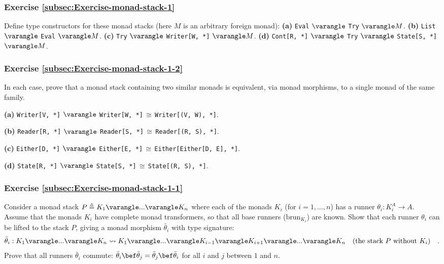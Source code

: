 \subsubsection{Exercise \label{subsec:Exercise-monad-stack-1}\ref{subsec:Exercise-monad-stack-1}}

Define type constructors for these monad stacks (here $M$ is an arbitrary
foreign monad):\textbf{ (a)} \lstinline!Eval! $\varangle$ \lstinline!Try!
$\varangle M$.\textbf{ (b)} \lstinline!List! $\varangle$ \lstinline!Eval!
$\varangle M$.\textbf{ (c)} \lstinline!Try! $\varangle$ \lstinline!Writer[W, *]!
$\varangle M$.\textbf{ (d)} \lstinline!Cont[R, *]! $\varangle$
\lstinline!Try! $\varangle$ \lstinline!State[S, *]! $\varangle M$.

\subsubsection{Exercise \label{subsec:Exercise-monad-stack-1-2}\ref{subsec:Exercise-monad-stack-1-2}}

In each case, prove that a monad stack containing two similar monads
is equivalent, via monad morphisms, to a single monad of the same
family. 

\textbf{(a)}  \lstinline!Writer[V, *]! $\varangle$ \lstinline!Writer[W, *]!$\,\cong\,$\lstinline!Writer[(V, W), *]!.

\textbf{(b)} \lstinline!Reader[R, *]! $\varangle$ \lstinline!Reader[S, *]!$\,\cong\,$\lstinline!Reader[(R, S), *]!.

\textbf{(c)} \lstinline!Either[D, *]! $\varangle$ \lstinline!Either[E, *]!$\,\cong\,$\lstinline!Either[Either[D, E], *]!.

\textbf{(d)} \lstinline!State[R, *]! $\varangle$ \lstinline!State[S, *]!$\,\cong\,$\lstinline!State[(R, S), *]!.

\subsubsection{Exercise \label{subsec:Exercise-monad-stack-1-1}\ref{subsec:Exercise-monad-stack-1-1}}

Consider a monad stack $P\triangleq K_{1}\varangle...\varangle K_{n}$
where each of the monads $K_{i}$ (for $i=1,...,n$) has a runner
$\theta_{i}:K_{i}^{A}\rightarrow A$. Assume that the monads $K_{i}$
have complete monad transformers, so that all base runners ($\text{brun}_{K_{i}}$)
are known. Show that each runner $\theta_{i}$ can be lifted to the
stack $P$, giving a monad morphism $\bar{\theta}_{i}$ with type
signature:
\[
\bar{\theta}_{i}:K_{1}\varangle...\varangle K_{n}\leadsto K_{1}\varangle...\varangle K_{i-1}\varangle K_{i+1}\varangle...\varangle K_{n}\quad\text{(the stack }P\text{ without }K_{i})\quad.
\]
Prove that all runners $\bar{\theta}_{i}$ commute: $\bar{\theta}_{i}\bef\bar{\theta}_{j}=\bar{\theta}_{j}\bef\bar{\theta}_{i}$
for all $i$ and $j$ between $1$ and $n$.

